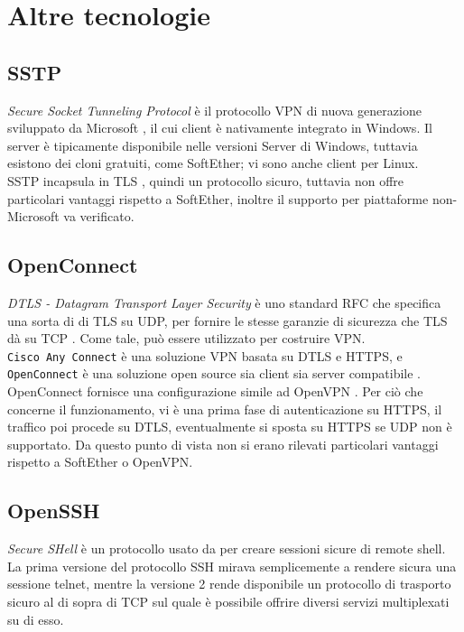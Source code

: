 \section{Altre tecnologie}
\subsection{SSTP}
\textit{Secure Socket Tunneling Protocol} è il protocollo VPN di nuova generazione sviluppato
da Microsoft \cite{sstp}, il cui client è nativamente integrato in Windows. Il server è tipicamente
disponibile nelle versioni Server di Windows, tuttavia esistono dei cloni gratuiti, come
SoftEther; vi sono anche client per Linux.\\
SSTP incapsula in TLS , quindi un protocollo
sicuro, tuttavia non offre particolari vantaggi rispetto a SoftEther, inoltre il supporto
per piattaforme non-Microsoft va verificato.

\subsection{OpenConnect}
\textit{DTLS - Datagram Transport Layer Security} è uno standard RFC che specifica
una sorta di di TLS su UDP, per fornire le stesse garanzie di sicurezza che TLS dà
su TCP \cite{RFC6347}. Come tale, può essere utilizzato per costruire VPN.\\
\texttt{Cisco Any Connect} è una soluzione VPN basata su DTLS e HTTPS, e
\texttt{OpenConnect} è una soluzione open source sia client sia server compatibile
\cite{cisco-vpn} \cite{openconnect-client} \cite{openconnect-server}.
OpenConnect fornisce una configurazione simile ad OpenVPN \cite{openconnect-server-conf}.
Per ciò che concerne il funzionamento, vi è una prima fase di
autenticazione su HTTPS, il traffico poi procede su DTLS, eventualmente si sposta su
HTTPS se UDP non è supportato. Da questo punto di vista non si erano rilevati particolari
vantaggi rispetto a SoftEther o OpenVPN.


\subsection{OpenSSH}
\textit{Secure SHell} è un protocollo usato da per creare sessioni sicure di remote shell.
La prima versione del protocollo SSH mirava semplicemente a rendere sicura una
sessione telnet, mentre la versione 2 rende disponibile un protocollo di trasporto sicuro
al di sopra di TCP
sul quale è possibile offrire diversi servizi multiplexati su di esso.

